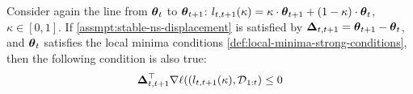 \documentclass{article} %
\newcommand{\hessian}{\vH}
\begin{document}
{%
}

\begin{corr}
\label{corr:non-increasing-gradient-alignm.}
    Consider again the line from $\mbox{$\mbox{$\boldsymbol{\theta}$}$}_{t}$ to $\mbox{$\mbox{$\boldsymbol{\theta}$}$}_{t+1}$: $l_{t,t+1}(\kappa) = \kappa\cdot \mbox{$\mbox{$\boldsymbol{\theta}$}$}_{t+1} + (1-\kappa)\cdot \mbox{$\mbox{$\boldsymbol{\theta}$}$}_{t}$, $\kappa \in [0,1]$. If \cref{assmpt:stable-ns-displacement} is satisfied by $\mbox{$\mbox{$\boldsymbol{\Delta}$}$}_{t,t+1} = \mbox{$\mbox{$\boldsymbol{\theta}$}$}_{t+1} - \mbox{$\mbox{$\boldsymbol{\theta}$}$}_t$, and $\mbox{$\mbox{$\boldsymbol{\theta}$}$}_t$ satisfies the local minima conditions \cref{def:local-minima-strong-conditions}, then the following condition is also true: 
    \begin{align}
        \mbox{$\mbox{$\boldsymbol{\Delta}$}$}_{t,t+1}^\top \nabla\ell((l_{t,t+1}(\kappa), \mbox{${\cal D}$}_{1:t}) \le 0
    \end{align}
\end{corr}
\end{document}

